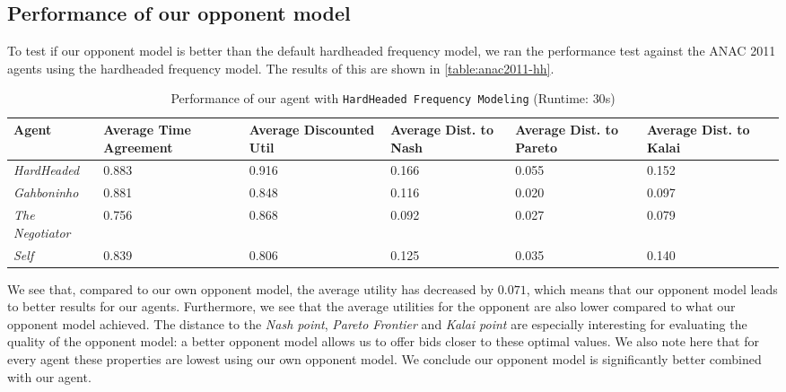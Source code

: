 \subsection{Performance of our opponent model}
To test if our opponent model is better than the default hardheaded frequency model, we ran the performance test against the ANAC 2011 agents using the hardheaded frequency model. The results of this are shown in \autoref{table:anac2011-hh}.
\begin{table}[H]
	\centering
	\small
    \begin{tabular}{m{2cm}m{2cm}m{2cm}m{2cm}m{2cm}m{2cm}m{2cm}}
    \toprule
    Agent              & Average Time Agreement & Average Discounted Util & Average Dist. to Nash & Average Dist. to Pareto & Average Dist. to Kalai \\
    \midrule
    \emph{HardHeaded}		& 0.883  & 0.916  & 0.166  & 0.055  & 0.152   \\ 
    \emph{Gahboninho}   	& 0.881  & 0.848  & 0.116  & 0.020  & 0.097   \\ 
    \emph{The Negotiator} 	& 0.756  & 0.868  & 0.092  & 0.027  & 0.079   \\ 
    \emph{Self}                 & 0.839  & 0.806  & 0.125  & 0.035  & 0.140   \\ 
    \bottomrule
    \end{tabular}
    \caption{Performance of our agent with \texttt{HardHeaded Frequency Modeling} (Runtime: $30$s) \label{table:anac2011-hh}}
\end{table}
We see that, compared to our own opponent model, the average utility has decreased by $0.071$, which means that our opponent model leads to  better results for our agents. 
Furthermore, we see that the average utilities for the opponent are also lower compared to what our opponent model achieved.
The distance to the \emph{Nash point}, \emph{Pareto Frontier} and \emph{Kalai point} are especially interesting for evaluating the quality of the opponent model: a better opponent model allows us to offer bids closer to these optimal values. We also note here that for every agent these properties are lowest using our own opponent model.
We conclude our opponent model is significantly better combined with our agent.








